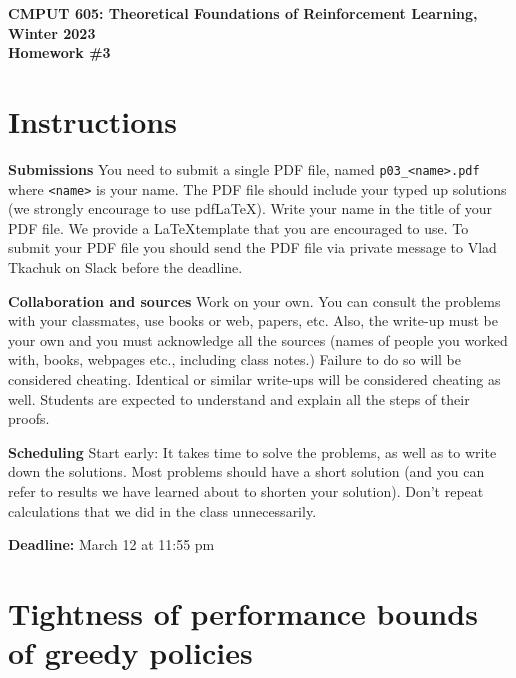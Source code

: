 \documentclass{article}
\newcommand{\hwnumber}{3}
\DeclareMathOperator*{\1}{\mathbbm{1}}
\newcommand{\0}{\mathbf{0}}
\theoremstyle{definition}
\theoremstyle{remark}
\theoremstyle{theorem}
\begin{document}
\begin{center}
{\Large \textbf{CMPUT 605: Theoretical Foundations of Reinforcement Learning, Winter 2023\\ Homework \#\hwnumber}}
\end{center}

\section*{Instructions}
\textbf{Submissions}
You need to submit a single PDF file, named {\tt p0\hwnumber\_<name>.pdf} where {\tt <name>} is your name.
The PDF file should include your typed up solutions (we strongly encourage to use pdf\LaTeX). 
Write your name in the title of your PDF file.
We provide a \LaTeX template that you are encouraged to use.
To submit your PDF file you should send the PDF file via private message to Vlad Tkachuk on Slack before the deadline.

\textbf{Collaboration and sources}
Work on your own. You can consult the problems with your classmates, use books
or web, papers, etc.
Also, the write-up must be your own and you must acknowledge all the
sources (names of people you worked with, books, webpages etc., including class notes.)
Failure to do so will be considered cheating.
Identical or similar write-ups will be considered cheating as well.
Students are expected to understand and explain all the steps of their proofs.

\textbf{Scheduling}
Start early: It takes time to solve the problems, as well as to write down the solutions. Most problems should have a short solution (and you can refer to results we have learned about to shorten your solution). Don't repeat calculations that we did in the class unnecessarily.

\vspace{0.3cm}

\textbf{Deadline:} March 12 at 11:55 pm

\newcommand{\cM}{\mathcal{M}}
\newcommand{\nS}{\mathrm{S}}
\newcommand{\nA}{\mathrm{A}}
\newcommand{\PP}{\mathbb{P}}
\newcommand{\RR}{\mathbb{R}}
\newcommand{\ip}[1]{\langle #1 \rangle}

\section*{Tightness of performance bounds of greedy policies}
\end{document}

